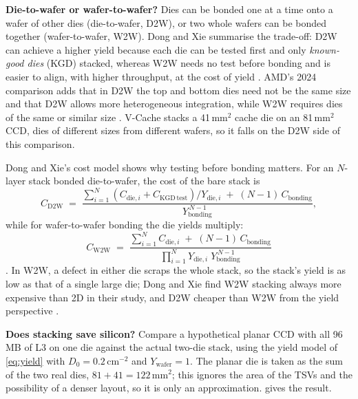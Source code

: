 \textbf{Die-to-wafer or wafer-to-wafer?} Dies can be bonded one at a time onto a wafer of other dies (die-to-wafer, D2W), or two whole wafers can be bonded together (wafer-to-wafer, W2W). Dong and Xie summarise the trade-off: D2W can achieve a higher yield because each die can be tested first and only \emph{known-good dies} (KGD) stacked, whereas W2W needs no test before bonding and is easier to align, with higher throughput, at the cost of yield \cite[sec.~IV.C]{dongSystemlevelCostAnalysis2009}. AMD's 2024 comparison adds that in D2W the top and bottom dies need not be the same size and that D2W allows more heterogeneous integration, while W2W requires dies of the same or similar size \cite[slide~10]{alam2ndGeneration3D2024}. V-Cache stacks a 41\,mm$^2$ cache die on an 81\,mm$^2$ CCD, dies of different sizes from different wafers, so it falls on the D2W side of this comparison.

Dong and Xie's cost model shows why testing before bonding matters. For an $N$-layer stack bonded die-to-wafer, the cost of the bare stack is
\begin{equation}
  C_{\mathrm{D2W}} \;=\; \frac{\sum_{i=1}^{N} \left(C_{\mathrm{die},i} + C_{\mathrm{KGD\,test}}\right)/Y_{\mathrm{die},i} \;+\; (N-1)\,C_{\mathrm{bonding}}}{Y_{\mathrm{bonding}}^{\,N-1}},
  \label{eq:d2w-cost}
\end{equation}
while for wafer-to-wafer bonding the die yields multiply:
\begin{equation}
  C_{\mathrm{W2W}} \;=\; \frac{\sum_{i=1}^{N} C_{\mathrm{die},i} \;+\; (N-1)\,C_{\mathrm{bonding}}}{\prod_{i=1}^{N} Y_{\mathrm{die},i} \; Y_{\mathrm{bonding}}^{\,N-1}}
  \label{eq:w2w-cost}
\end{equation}
\cite[Eqs.~16--17]{dongSystemlevelCostAnalysis2009}. In W2W, a defect in either die scraps the whole stack, so the stack's yield is as low as that of a single large die; Dong and Xie find W2W stacking always more expensive than 2D in their study, and D2W cheaper than W2W from the yield perspective \cite[sec.~IV.C]{dongSystemlevelCostAnalysis2009}.

\textbf{Does stacking save silicon?} Compare a hypothetical planar CCD with all 96\,MB of L3 on one die against the actual two-die stack, using the yield model of \cref{eq:yield} with $D_0 = 0.2$\,cm$^{-2}$ and $Y_{\mathrm{wafer}} = 1$. The planar die is taken as the sum of the two real dies, $81 + 41 = 122$\,mm$^2$; this ignores the area of the TSVs and the possibility of a denser layout, so it is only an approximation.  gives the result.

